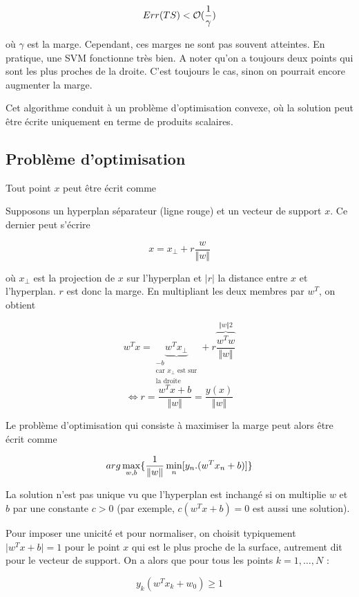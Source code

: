 	$$Err(TS) < \mathcal{O} (\frac{1}{\gamma})$$
	
	où $\gamma$ est la marge. Cependant, ces marges ne sont pas souvent atteintes. En pratique, une SVM fonctionne très bien. A noter qu'on a toujours deux points qui sont les plus proches de la droite. C'est toujours le cas, sinon on pourrait encore augmenter la marge.
	
	Cet algorithme conduit à un problème d'optimisation convexe, où la solution peut être écrite uniquement en terme de produits scalaires.
	
	\subsection{Problème d'optimisation}
	
	
	Tout point $x$ peut être écrit comme
	
	Supposons un hyperplan séparateur (ligne rouge) et un vecteur de support $x$. Ce dernier peut s'écrire	
	
	$$x = x_{\perp} + r \frac{w}{\Vert w \Vert}$$
	
	où $x_{\perp}$ est la projection de $x$ sur l'hyperplan et $\vert r \vert$ la distance entre $x$ et l'hyperplan. $r$ est donc la marge. En multipliant les deux membres par $w^T$, on obtient
	
	$$w^Tx = \underbrace{w^T x_{\perp}}_{\substack{-b\\ \text{car } x_{\perp} \text{ est sur} \\ \text{la droite}}} + r \frac{\overbrace{w^T w}^{\Vert w \Vert2}}{\Vert w \Vert}$$
	$$\Leftrightarrow r = \frac{w^Tx + b}{\Vert w \Vert} = \frac{y(x)}{\Vert w \Vert}$$
	
	Le problème d'optimisation qui consiste à maximiser la marge peut alors être écrit comme 
	
	$$arg \max_{w, b} \lbrace \frac{1}{\Vert w \Vert} \min_{n} [y_n . (w^T x_n + b)] \rbrace$$
		
	La solution n'est pas unique vu que l'hyperplan est inchangé si  on multiplie $w$ et $b$ par une constante $c > 0$ (par exemple, $c (w^Tx + b) = 0$ est aussi une solution). 
	
	Pour imposer une unicité et pour normaliser, on choisit typiquement $\vert w^T x + b \vert = 1$ pour le point $x$ qui est le plus proche de la surface, autrement dit pour le vecteur de support. On a alors que pour tous les points $k = 1, \dots , N$ :
	
	$$y_k(w^T x_k + w_0) \geq 1$$
	
